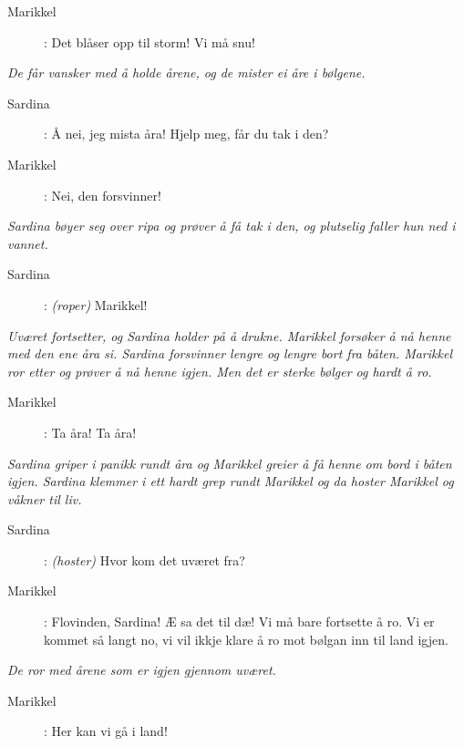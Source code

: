 {\begin{description}
\item[Marikkel]: Det blåser opp til storm! Vi må snu! 
\end{description}

\noindent \textit{\color{gray} De får vansker med å holde årene, og de mister ei åre i bølgene.}

\begin{description}
\item[Sardina]: Å nei, jeg mista åra! Hjelp meg, får du tak i den? 
\item[Marikkel]: Nei, den forsvinner!
\end{description}

\noindent \textit{\color{gray} Sardina bøyer seg over ripa og prøver å få tak i den, og plutselig faller hun ned i vannet.}

\begin{description}
\item[Sardina]:  \textit{\color{gray} (roper)} Marikkel! 
\end{description}

\noindent \textit{\color{gray} Uværet fortsetter, og Sardina holder på å drukne. Marikkel forsøker å nå henne med den ene åra si. Sardina forsvinner lengre og lengre bort fra båten. Marikkel ror etter og prøver å nå henne igjen. Men det er sterke bølger og hardt å ro.}

\begin{description}
\item[Marikkel]: Ta åra! Ta åra!
\end{description}

\noindent \textit{\color{gray} Sardina griper i panikk rundt åra og Marikkel greier å få henne om bord i båten igjen. Sardina klemmer i ett hardt grep rundt Marikkel og da hoster Marikkel og våkner til liv.}

\begin{description}
\item[Sardina]:  \textit{\color{gray} (hoster)} Hvor kom det uværet fra? 
\item[Marikkel]: Flovinden, Sardina! Æ sa det til dæ! Vi må bare fortsette å ro. Vi er kommet så langt no, vi vil ikkje klare å ro mot bølgan inn til land igjen. 
\end{description}

\noindent \textit{\color{gray} De ror med årene som er igjen gjennom uværet.}

\begin{description}
\item[Marikkel]: Her kan vi gå i land! 
\end{description}

}
